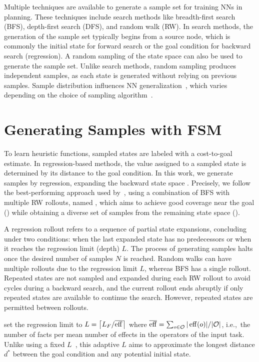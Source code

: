 \documentclass[ppgc,diss,english]{iiufrgs}
\providecommand{\ceil}[1]{\ensuremath{\left\lceil #1\right\rceil}}
\begin{document}
Multiple techniques are available to generate a sample set for training NNs in planning. These techniques include search methods like breadth-first search (BFS), depth-first search (DFS), and random walk (RW). In search methods, the generation of the sample set typically begins from a source node, which is commonly the initial state for forward search or the goal condition for backward search (regression). A random sampling of the state space can also be used to generate the sample set. Unlike search methods, random sampling produces independent samples, as each state is generated without relying on previous samples. Sample distribution influences NN generalization~\cite{Ferber.etal/2020a}, which varies depending on the choice of sampling algorithm~\cite{Bettker.etal/2022}.

\section{Generating Samples with FSM}
\label{sec:sample-learn-h}
To learn heuristic functions, sampled states are labeled with a cost-to-goal estimate. In regression-based methods, the value assigned to a sampled state is determined by its distance to the goal condition. In this work, we generate samples by regression, expanding the backward state space \bsp. Precisely, we follow the best-performing approach used by~\citet{Bettker.etal/2022}, using a combination of BFS with multiple RW rollouts, named \bfsrw, which aims to achieve good coverage near the goal (\bfs) while obtaining a diverse set of samples from the remaining state space (\rw).

A regression rollout refers to a sequence of partial state expansions, concluding under two conditions: when the last expanded state has no predecessors or when it reaches the regression limit (depth) $L$. The process of generating samples halts once the desired number of samples $N$ is reached. Random walks can have multiple rollouts due to the regression limit $L$, whereas BFS has a single rollout. Repeated states are not sampled and expanded during each RW rollout to avoid cycles during a backward search, and the current rollout ends abruptly if only repeated states are available to continue the search. However, repeated states are permitted between rollouts.

\citet{Bettker.etal/2022} set the regression limit to $L=\ceil{\facts/\overline{\eff}}$ where $\overline{\operatorname{eff}}=\sum_{o\in \mathcal{O}} |\operatorname{eff}(o)|/|\mathcal{O}|$, i.e.,~the number of facts per mean number of effects in the operators of the input task. Unlike using a fixed $L$~\cite{Yu.etal/2020, OToole/2022}, this adaptive $L$ aims to approximate the longest distance $d^{*}$ between the goal condition and any potential initial state.
\end{document}
